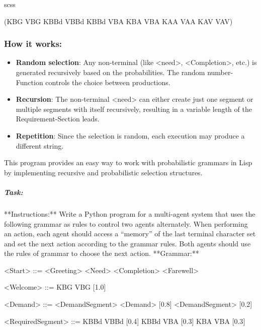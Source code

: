 \documentclass[
]{article}
\begin{document}
scss

(KBG VBG KBBd VBBd KBBd VBA KBA VBA KAA VAA KAV VAV)

\subsubsection{\texorpdfstring{\textbf{How it
works:}}{How it works:}}\label{how-it-works}

\begin{itemize}
\item
  \textbf{Random selection}: Any non-terminal (like
  \textless need\textgreater, \textless Completion\textgreater, etc.) is
  generated recursively based on the probabilities. The random
  number-Function controls the choice between productions.
\item
  \textbf{Recursion}: The non-terminal \textless need\textgreater{} can
  either create just one segment or multiple segments with itself
  recursively, resulting in a variable length of the Requirement-Section
  leads.
\item
  \textbf{Repetition}: Since the selection is random, each execution may
  produce a different string.
\end{itemize}

This program provides an easy way to work with probabilistic grammars in
Lisp by implementing recursive and probabilistic selection structures.

\subparagraph{\texorpdfstring{\textbf{Task:}}{Task:}}\label{task-5}

**Instructions:** Write a Python program for a multi-agent system that
uses the following grammar as rules to control two agents alternately.
When performing an action, each agent should access a ``memory'' of the
last terminal character set and set the next action according to the
grammar rules. Both agents should use the rules of grammar to choose the
next action. **Grammar:**

\textless Start\textgreater{} ::= \textless Greeting\textgreater{}
\textless Need\textgreater{} \textless Completion\textgreater{}
\textless Farewell\textgreater{}

\textless Welcome\textgreater{} ::= KBG VBG {[}1.0{]}

\textless Demand\textgreater{} ::= \textless DemandSegment\textgreater{}
\textless Demand\textgreater{} {[}0.8{]} \textbar{}
\textless DemandSegment\textgreater{} {[}0.2{]}

\textless RequiredSegment\textgreater{} ::= KBBd VBBd {[}0.4{]}
\textbar{} KBBd VBA {[}0.3{]} \textbar{} KBA VBA {[}0.3{]}
\end{document}
